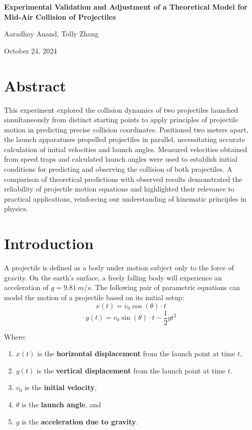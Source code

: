\documentclass[12pt]{article}
\begin{document}
\begin{titlepage}
    \centering
    \vfill
    \vspace*{2.5in}
    {\Huge\bfseries Experimental Validation and Adjustment of a Theoretical Model for Mid-Air Collision of Projectiles \par}
    \vspace{0.2in}
    {\LARGE Aaradhay Anand, Tolly Zhang\par}
    \vspace{0.2in}
    {\LARGE October 24, 2024 \par}
    \vfill
\end{titlepage}

\newpage

\section{Abstract}
This experiment explored the collision dynamics of two projectiles launched simultaneously from distinct starting points to apply principles of projectile motion in predicting precise collision coordinates. Positioned two meters apart, the launch apparatuses propelled projectiles in parallel, necessitating accurate calculation of initial velocities and launch angles. Measured velocities obtained from speed traps and calculated launch angles were used to establish initial conditions for predicting and observing the collision of both projectiles. A comparison of theoretical predictions with observed results demonstrated the reliability of projectile motion equations and highlighted their relevance to practical applications, reinforcing our understanding of kinematic principles in physics.

\section{Introduction}
A projectile is defined as a body under motion subject only to the force of gravity. On the earth's surface, a freely falling body will experience an acceleration of $g=9.81 \ m/s$. The following pair of parametric equations can model the motion of a projectile based on its initial setup:
\[x(t) = v_0 \cos(\theta) \cdot t\]
\[y(t) = v_0 \sin(\theta) \cdot t - \frac{1}{2} g t^2\]

Where:
\begin{enumerate}
    \item $x(t)$ is the \textbf{horizontal displacement} from the launch point at time $t$,
    \item $y(t)$ is the \textbf{vertical displacement} from the launch point at time $t$.
    \item $v_0$ is the \textbf{initial velocity},
    \item $\theta$ is the \textbf{launch angle}, and
    \item $g$ is the \textbf{acceleration due to gravity}.
\end{enumerate}
\end{document}
